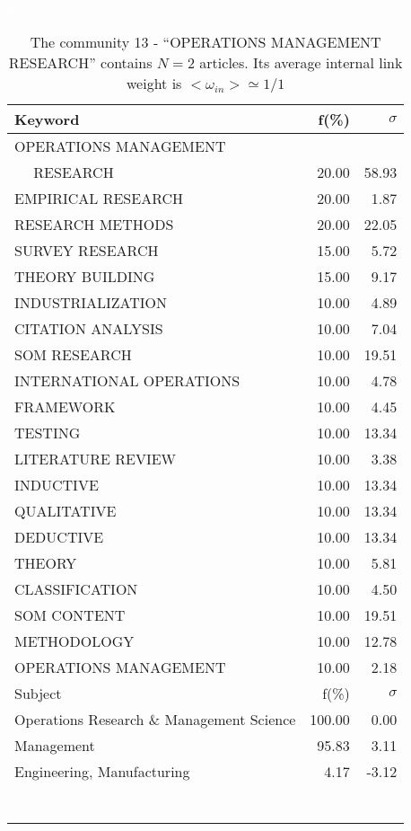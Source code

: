 \documentclass[a4paper,11pt]{report}
\begin{document}
\begin{landscape}
\begin{table}[!ht]
\caption{The community 13 - ``OPERATIONS MANAGEMENT RESEARCH'' contains $N = 2$ articles. Its average internal link weight is $<\omega_{in}> \simeq 1/1$ }
\textcolor{white}{aa}\\
{\scriptsize\begin{tabular}{|l r r|}
\hline
Keyword & f(\%) & $\sigma$\\
\hline
OPERATIONS MANAGEMENT &  & \\
$\quad$ RESEARCH & 20.00 & 58.93\\
EMPIRICAL RESEARCH & 20.00 & 1.87\\
RESEARCH METHODS & 20.00 & 22.05\\
SURVEY RESEARCH & 15.00 & 5.72\\
THEORY BUILDING & 15.00 & 9.17\\
INDUSTRIALIZATION & 10.00 & 4.89\\
CITATION ANALYSIS & 10.00 & 7.04\\
SOM RESEARCH & 10.00 & 19.51\\
INTERNATIONAL OPERATIONS & 10.00 & 4.78\\
FRAMEWORK & 10.00 & 4.45\\
TESTING & 10.00 & 13.34\\
LITERATURE REVIEW & 10.00 & 3.38\\
INDUCTIVE & 10.00 & 13.34\\
QUALITATIVE & 10.00 & 13.34\\
DEDUCTIVE & 10.00 & 13.34\\
THEORY & 10.00 & 5.81\\
CLASSIFICATION & 10.00 & 4.50\\
SOM CONTENT & 10.00 & 19.51\\
METHODOLOGY & 10.00 & 12.78\\
OPERATIONS MANAGEMENT & 10.00 & 2.18\\
\hline
\hline
Subject & f(\%) & $\sigma$\\
\hline
Operations Research \& Management Science & 100.00 & 0.00\\
Management & 95.83 & 3.11\\
Engineering, Manufacturing & 4.17 & -3.12\\
 &  & \\
 &  & \\
 &  & \\
 &  & \\
 &  & \\
 &  & \\
 &  & \\

\end{tabular}}
\end{table}
\end{landscape}
\end{document}
